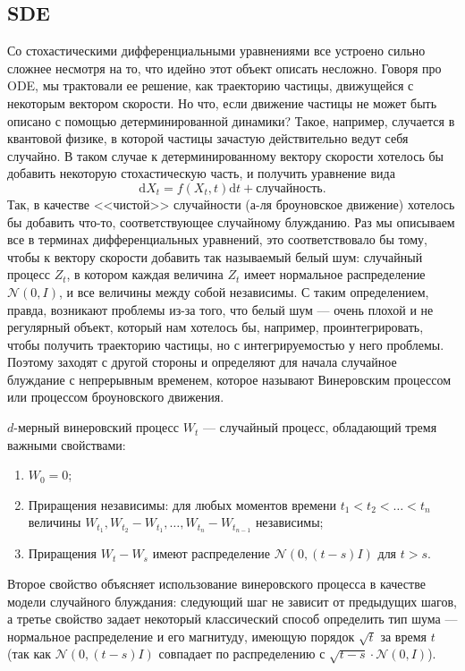 \documentclass[12pt]{article}
\theoremstyle{definition}
\begin{document}
\subsection{SDE}
Со стохастическими дифференциальными уравнениями все устроено сильно сложнее несмотря на то, что идейно этот объект описать несложно. Говоря про ODE, мы трактовали ее решение, как траекторию частицы, движущейся с некоторым вектором скорости. Но что, если движение частицы не может быть описано с помощью детерминированной динамики? Такое, например, случается в квантовой физике, в которой частицы зачастую действительно ведут себя случайно. В таком случае к детерминированному вектору скорости хотелось бы добавить некоторую стохастическую часть, и получить уравнение вида
\[
    \mathrm{d} X_t = f(X_t, t) \mathrm{d} t + \text{случайность}.
\]
Так, в качестве <<чистой>> случайности (а-ля броуновское движение)   хотелось бы добавить что-то, соответствующее случайному блужданию. Раз мы описываем все в терминах дифференциальных уравнений, это соответствовало бы тому, чтобы к вектору скорости добавить так называемый белый шум: случайный процесс $Z_t$, в котором каждая величина $Z_t$ имеет нормальное распределение $\mathcal{N}(0, I)$, и все величины между собой независимы. С таким определением, правда, возникают проблемы из-за того, что белый шум --- очень плохой и не регулярный объект, который нам хотелось бы, например, проинтегрировать, чтобы получить траекторию частицы, но с интегрируемостью у него проблемы. Поэтому заходят с другой стороны и определяют для начала случайное блуждание с непрерывным временем, которое называют Винеровским процессом или процессом броуновского движения.

$d$-мерный  винеровский процесс $W_t$ --- случайный процесс, обладающий тремя важными свойствами:
\begin{enumerate}
    \item $W_0 = 0$;
    \item Приращения независимы: для любых моментов времени $t_1 < t_2 < \ldots < t_n$ величины $W_{t_1}, W_{t_2} - W_{t_1}, \ldots, W_{t_n} - W_{t_{n-1}}$ независимы;
    \item Приращения $W_{t} - W_{s}$ имеют распределение $\mathcal{N}(0, (t - s) I)$ для $t > s$.
\end{enumerate}

Второе свойство объясняет использование винеровского процесса в качестве модели случайного блуждания: следующий шаг не зависит от предыдущих шагов, а третье свойство задает некоторый классический способ определить тип шума --- нормальное распределение и его магнитуду, имеющую порядок $\sqrt{t}$ за время $t$ (так как $\mathcal{N}(0, (t - s)I)$ совпадает по распределению с $\sqrt{t - s} \cdot \mathcal{N}(0, I)$).
\end{document}
